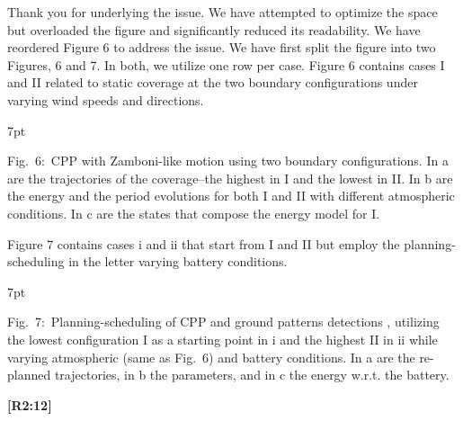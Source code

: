 \documentclass[10pt]{letter}
\newenvironment{formal}{%
  \def\FrameCommand{%
    \hspace{1pt}%
    {\color{red}\vrule width 2pt}%
    {\color{formalshade}\vrule width 4pt}%
    \colorbox{formalshade}%
  }%
  \MakeFramed{\advance\hsize-\width\FrameRestore}%
  \noindent\hspace{-4.55pt}%
  \begin{adjustwidth}{}{7pt}%
  \vspace{2pt}\vspace{2pt}%
}
{%
  \vspace{2pt}\end{adjustwidth}\endMakeFramed%
}
\begin{document}
{\color{blue} 

{\hspace*{-4.5em}{[R2:11]}\vspace*{-1.9em}}

Thank you for underlying the issue. We have attempted to optimize the space but overloaded the figure and significantly reduced its readability. We have reordered Figure 6 to address the issue. We have first split the figure into two Figures, 6 and 7. In both, we utilize one row per case. Figure 6 contains cases I and II related to static coverage at the two boundary configurations under varying wind speeds and directions.


\begin{formal}
  \footnotesize
  
  {\color{blue}Fig.~6:~\color{blue}CPP with Zamboni-like motion using two boundary configurations. In {\color{red}a} are the trajectories of the coverage--the highest in {\color{red}I} and the lowest in {\color{red}II}. In {\color{red}b} are the energy and the period evolutions for both {\color{red}I} and {\color{red}II} with different atmospheric conditions. In {\color{red}c} are the states that compose the energy model for {\color{red}I}.}
\end{formal}

Figure 7 contains cases i and ii that start from I and II but employ the planning-scheduling in the letter varying battery conditions. 

\begin{formal}
  \footnotesize
  
  \vspace*{-.6ex}
  {\color{blue}
  Fig.~7:~Planning-scheduling of CPP and ground patterns detections%
  , utilizing the lowest configuration {\color{red}I} as a starting point in {\color{red}i} and the highest {\color{red}II} in {\color{red}ii} while varying atmospheric (same as Fig.~{\color{red}6}) and battery conditions. In {\color{red}a} are the re-planned trajectories, in {\color{red}b} the parameters, and in {\color{red}c} the energy w.r.t. the battery.}
  \vspace*{1ex}
\end{formal}
}

\vspace*{2em}

{\hspace*{-4.5em}\textbf{[R2:12]}\vspace*{-1.9em}}
\end{document}
